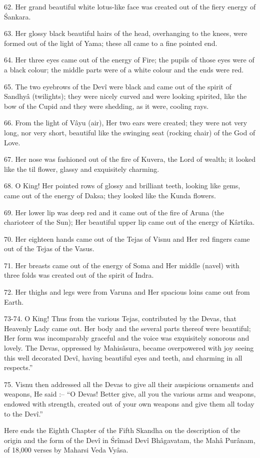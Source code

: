 62. Her grand beautiful white lotus-like face was created out of the fiery energy of \'Sankara.

63. Her glossy black beautiful hairs of the head, overhanging to the knees, were formed out of the light of Yama; these all came to a fine pointed end.

64. Her three eyes came out of the energy of Fire; the pupils of those eyes were of a black colour; the middle parts were of a white colour and the ends were red.

65. The two eyebrows of the Dev\^i were black and came out of the spirit of Sandhy\^a (twilights); they were nicely curved and were looking spirited, like the bow of the Cupid and they were shedding, as it were, cooling rays.

66. From the light of V\^ayu (air), Her two ears were created; they were not very long, nor very short, beautiful like the swinging seat (rocking chair) of the God of Love.

67. Her nose was fashioned out of the fire of Kuvera, the Lord of wealth; it looked like the til flower, glassy and exquisitely charming.

68. O King! Her pointed rows of glossy and brilliant teeth, looking like gems, came out of the energy of Daksa; they looked like the Kunda flowers.

69. Her lower lip was deep red and it came out of the fire of Aruna (the charioteer of the Sun); Her beautiful upper lip came out of the energy of K\^artika.

70. Her eighteen hands came out of the Tejas of Visnu and Her red fingers came out of the Tejas of the Vasus.

71. Her breasts came out of the energy of Soma and Her middle (navel) with three folds was created out of the spirit of Indra.

72. Her thighs and legs were from Varuna and Her spacious loins came out from Earth.

73-74. O King! Thus from the various Tejas, contributed by the Devas, that Heavenly Lady came out. Her body and the several parts thereof were beautiful; Her form was incomparably graceful and the voice was exquisitely sonorous and lovely. The Devas, oppressed by Mahis\^asura, became overpowered with joy seeing this well decorated Dev\^i, having beautiful eyes and teeth, and charming in all respects.''

75. Visnu then addressed all the Devas to give all their auspicious ornaments and weapons, He said :-- ``O Devas! Better give, all you the various arms and weapons, endowed with strength, created out of your own weapons and give them all today to the Dev\^i.''

Here ends the Eighth Chapter of the Fifth Skandha on the description of the origin and the form of the Dev\^i in \'Sr\^imad Dev\^i Bh\^agavatam, the Mah\^a Pur\^anam, of 18,000 verses by Maharsi Veda Vy\^asa.